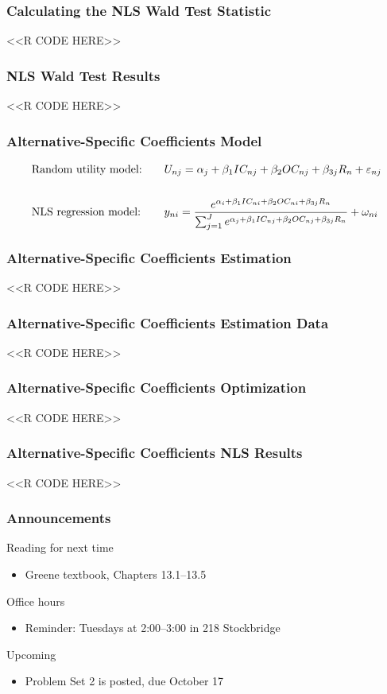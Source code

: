 \documentclass{beamer}
\begin{document}
\begin{frame}[fragile]\frametitle{Calculating the NLS Wald Test Statistic}
    <<R CODE HERE>>
\end{frame}

\begin{frame}[fragile]\frametitle{NLS Wald Test Results}
    <<R CODE HERE>>
\end{frame}

\begin{frame}\frametitle{Alternative-Specific Coefficients Model}
    \begin{alignat*}{2}
    &\text{Random utility model:} \quad &&U_{nj} = \alpha_j + \beta_1 IC_{nj} + \beta_2 OC_{nj} + \beta_{3j} R_n + \varepsilon_{nj} \\
    \intertext{}
    &\text{NLS regression model:} \quad &&y_{ni} =  \frac{e^{ \alpha_i + \beta_1 IC_{ni} + \beta_2 OC_{ni} + \beta_{3j} R_n}}{\sum_{j = 1}^J e^{ \alpha_j + \beta_1 IC_{nj} + \beta_2 OC_{nj} + \beta_{3j} R_n}} + \omega_{ni}
    \end{alignat*}
\end{frame}

\begin{frame}[fragile]\frametitle{Alternative-Specific Coefficients Estimation}
    <<R CODE HERE>>
\end{frame}

\begin{frame}[fragile]\frametitle{Alternative-Specific Coefficients Estimation Data}
    <<R CODE HERE>>
\end{frame}

\begin{frame}[fragile]\frametitle{Alternative-Specific Coefficients Optimization}
    <<R CODE HERE>>
\end{frame}

\begin{frame}[fragile]\frametitle{Alternative-Specific Coefficients NLS Results}
    <<R CODE HERE>>
\end{frame}

\begin{frame}\frametitle{Announcements}
    Reading for next time
    \begin{itemize}
        \item Greene textbook, Chapters 13.1--13.5
    \end{itemize}
    \vspace{3ex}
    Office hours
    \begin{itemize}
        \item Reminder: Tuesdays at 2:00--3:00 in 218 Stockbridge
    \end{itemize}
    \vspace{3ex}
    Upcoming
    \begin{itemize}
        \item Problem Set 2 is posted, due October 17
    \end{itemize}
\end{frame}
\end{document}
